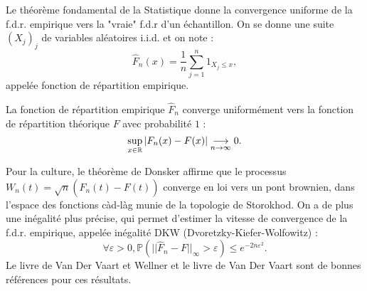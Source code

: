 \begin{thm}
\end{thm}
 
Le théorème fondamental de la Statistique donne la convergence uniforme de la f.d.r. empirique vers la "vraie" f.d.r d'un échantillon. On se donne une suite $(X_j)_j$ de variables aléatoires i.i.d. et on note : 
\[\hat F_n(x) = \frac{1}{n} \sum_{j=1}^n 1_{X_j\leq x},\]
appelée fonction de répartition empirique.

\begin{thm}
La fonction de répartition empirique $\hat F_n$ converge uniformément vers la fonction de répartition théorique $F$ avec probabilité $1$ :
\[\sup_{x\in \mathbb R} |F_n(x)-F(x)| \underset{n\to\infty}{\longrightarrow} 0.\]
\end{thm}

Pour la culture, le théorème de Donsker affirme que le processus $W_n(t) = \sqrt{n}(\hat F_n(t)-F(t))$ converge en loi vers un pont brownien, dans l'espace des fonctions càd-làg munie de la topologie de Storokhod. On a de plus une inégalité plus précise, qui permet d'estimer la vitesse de convergence de la f.d.r. empirique, appelée inégalité DKW (Dvoretzky-Kiefer-Wolfowitz) :
\[\forall \varepsilon>0, \mathbb{P}(||\hat F_n -F||_\infty>\varepsilon)\leq e^{-2n\varepsilon^2}.\] 
Le livre de Van Der Vaart et Wellner \cite{VDVWellner} et le livre de Van Der Vaart \cite{VDV} sont de bonnes références pour ces résultats. 
